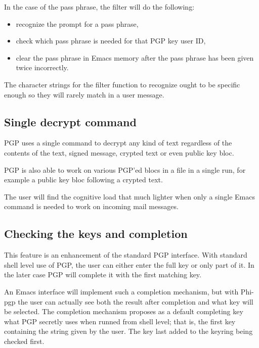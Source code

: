 In the case of the pass phrase, the filter will  do the following:

\begin{itemize}
\item recognize the prompt for a pass phrase, 

\item check which pass phrase is needed for that PGP key user ID,

 \item clear the pass phrase  in Emacs memory  after the pass phrase has
been given twice incorrectly.
\end{itemize}

The character strings for the filter function to recognize ought to be
specific enough so they will rarely match in a user message.

\subsection{Single decrypt command}

PGP uses  a single command to decrypt  any kind of text regardless of
the contents of the text, signed  message, crypted text or even public
key bloc.

PGP is also able to work on various PGP'ed blocs in a file in a single
run, for example a public key bloc following a crypted text.

The user will find the  cognitive load that  much lighter when only  a
single Emacs command is needed to work on incoming mail messages.

\subsection{Checking  the keys and completion}

This feature is  an enhancement  of  the standard PGP interface.  With
standard shell level use  of PGP, the user can  either enter the  full
key or  only part of it. In  the later case  PGP will complete it with
the first matching key.

An Emacs  interface  will implement such  a  completion mechanism, but
with Phi-pgp  the  user  can  actually  see   both the result    after
completion and  what key  will be  selected.  The completion mechanism
proposes as  a default  completing  key what  PGP secretly   uses when
runned from shell level; that is, the first  key containing the string
given by the user.  The key  last added to  the keyring being checked
first.

